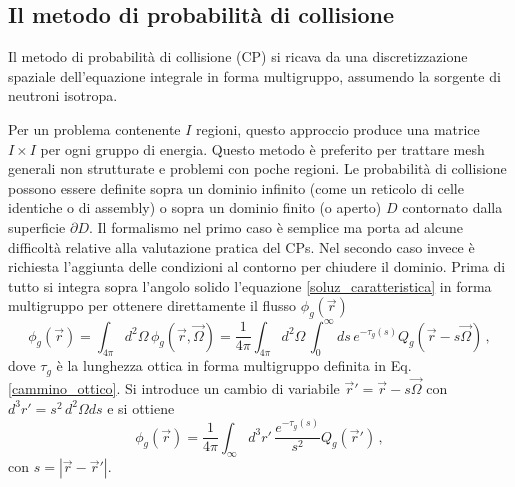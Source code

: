 \subsection{Il metodo di probabilità di collisione \label{probcoll}}
Il metodo di probabilità di collisione (CP) si ricava da una discretizzazione 
spaziale dell'equazione integrale in forma multigruppo, assumendo la sorgente di 
neutroni isotropa.

Per un problema contenente $I$ regioni, questo approccio produce una matrice $I 
\times I$ per ogni gruppo di energia. 
Questo metodo è preferito per trattare mesh generali non strutturate e problemi 
con poche regioni.
Le probabilità di collisione possono essere definite sopra un dominio infinito 
(come un reticolo di celle identiche o di assembly) o sopra un dominio finito (o 
aperto) $D$ contornato dalla superficie $\partial D$.
Il formalismo nel primo caso è semplice ma porta ad alcune difficoltà relative alla 
valutazione pratica del CPs. Nel secondo caso invece è richiesta l'aggiunta 
delle condizioni al contorno per chiudere il dominio.
Prima di tutto si integra sopra l'angolo solido l'equazione \eqref{soluz_caratteristica} in forma multigruppo per ottenere direttamente il flusso 
$\phi_g(\vec{r})$
\begin{equation}
\phi_g(\vec{r})=\int_{4\pi} d^2\Omega \, 
\phi_g(\vec{r},\vec{\Omega})=\frac{1}{4\pi}\int_{4\pi} d^2\Omega \, 
\int_0^\infty ds \, e^{-\tau_g(s)} Q_g(\vec{r}-s\vec{\Omega}) \,,
\end{equation}
dove $\tau_g$ è la lunghezza ottica in forma multigruppo definita in Eq. 
\eqref{cammino_ottico}.
Si introduce un cambio di variabile $\vec{r}'=\vec{r}-s\vec{\Omega}$ con 
$d^3r'=s^2\,d^2\Omega ds$ e si ottiene 
\begin{equation}
\phi_g(\vec{r})=\frac{1}{4\pi}\int_\infty d^3r' \, 
\frac{e^{-\tau_g(s)}}{s^2}Q_g(\vec{r}') \,,
\end{equation}
con $s=|\vec{r}-\vec{r}'|$.


